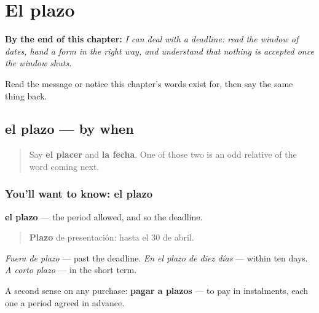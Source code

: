 
\chapter{El plazo}
\label{ch:es-plazo}

\begin{chapteropening}
\textbf{By the end of this chapter:} \emph{I can deal with a deadline: read the window of dates, hand a form in the right way, and understand that nothing is accepted once the window shuts.}

Read the message or notice this chapter's words exist for, then say the same thing back.
\end{chapteropening}

\section[el plazo]{el plazo — by when}

\label{lesson:ES-C458-plazo}



\begin{quote}
Say \textbf{el placer} and \textbf{la fecha}. One of those two is an odd relative of the word coming next.
\end{quote}

\subsection*{You'll want to know: el plazo}
\textbf{el plazo} — the period allowed, and so the deadline.

\begin{quote}
\textbf{Plazo} de presentación: hasta el 30 de abril.
\end{quote}

\emph{Fuera de plazo} — past the deadline. \emph{En el plazo de diez días} — within ten days. \emph{A corto plazo} — in the short term.

A second sense on any purchase: \textbf{pagar a plazos} — to pay in instalments, each one a period agreed in advance.

